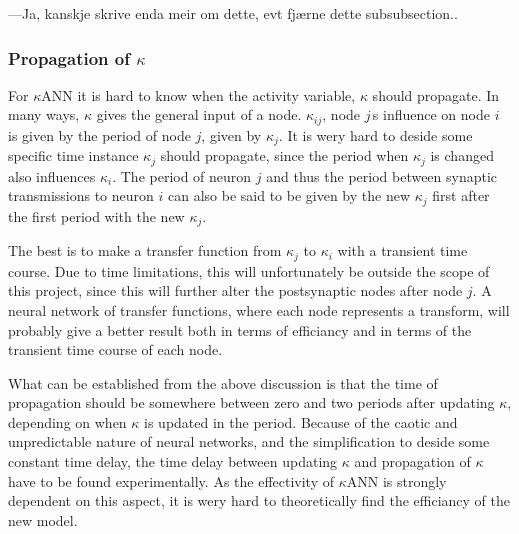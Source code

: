 	---Ja, kanskje skrive enda meir om dette, evt fjærne dette subsubsection..
	


	\subsubsection{Propagation of $\kappa$}
	For $\kappa$ANN it is hard to know when the activity variable, $\kappa$ should propagate. In many ways, $\kappa$ gives the general input of a node.
	$\kappa_{ij}$, node $j$\,s influence on node $i$ is given by the period of node $j$, given by $\kappa_j$. 
	It is wery hard to deside some specific time instance $\kappa_j$ should propagate, since the period when $\kappa_j$ is changed also influences $\kappa_i$. 
	The period of neuron $j$ and thus the period between synaptic transmissions to neuron $i$ can also be said to be given by the new $\kappa_j$ first after the first period with the new $\kappa_j$.
	
	The best is to make a transfer function from $\kappa_j$ to $\kappa_i$ with a transient time course. 
	Due to time limitations, this will unfortunately be outside the scope of this project, since this will further alter the postsynaptic nodes after node $j$. 
	A neural network of transfer functions, where each node represents a transform, will probably give a better result both in terms of efficiancy and in terms of the transient time course of each node.
	
	What can be established from the above discussion is that the time of propagation should be somewhere between zero and two periods after updating $\kappa$, depending on when $\kappa$ is updated in the period.
	Because of the caotic and unpredictable nature of neural networks, and the simplification to deside some constant time delay, the time delay between updating $\kappa$ and propagation of $\kappa$ have to be found experimentally.
	As the effectivity of $\kappa$ANN is strongly dependent on this aspect, it is wery hard to theoretically find the efficiancy of the new model.

